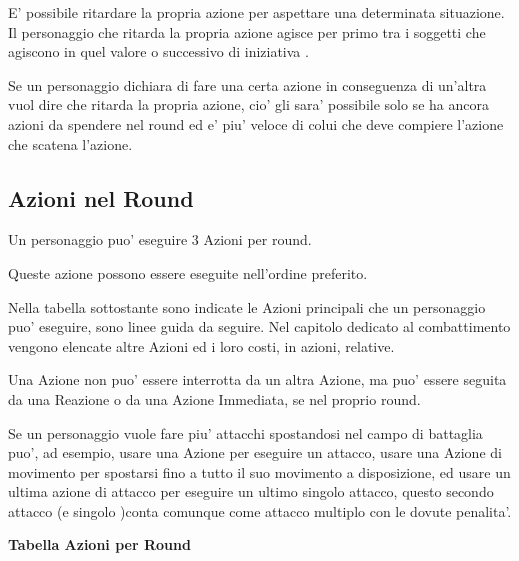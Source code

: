 \documentclass[a4paper,11pt,twoside,openany]{book}
\begin{document}
	E' possibile ritardare la propria azione per aspettare una determinata situazione. Il personaggio che ritarda la propria azione agisce per primo tra i soggetti che agiscono in quel valore o successivo di iniziativa .
	
	Se un personaggio dichiara di fare una certa azione in conseguenza di un'altra vuol dire che ritarda la propria azione, cio' gli sara' possibile solo se ha ancora azioni da spendere nel round ed e' piu' veloce di colui che deve compiere l'azione che scatena l'azione.
	
	\subsection{Azioni nel Round}
	
	\label{azioni-nel-round}
	
	Un personaggio puo' eseguire 3 Azioni per round.
	
	Queste azione possono essere eseguite nell'ordine preferito.
	
	Nella tabella sottostante sono indicate le Azioni principali che un personaggio puo' eseguire, sono linee guida da seguire. Nel capitolo dedicato al combattimento vengono elencate altre Azioni ed i loro costi, in azioni, relative.
	
	Una Azione non puo' essere interrotta da un altra Azione, ma puo' essere seguita da una Reazione o da una Azione Immediata, se nel proprio round.
	
	Se un personaggio vuole fare piu' attacchi spostandosi nel campo di battaglia puo', ad esempio, usare una Azione per eseguire un attacco, usare una Azione di movimento per spostarsi fino a tutto il suo movimento a disposizione, ed usare un ultima azione di attacco per eseguire un ultimo singolo attacco, questo secondo attacco (e singolo )conta comunque come attacco multiplo con le dovute penalita'.
	
	\medskip
	
	\textbf{Tabella Azioni per Round}
	
	\medskip
	
\end{document}
